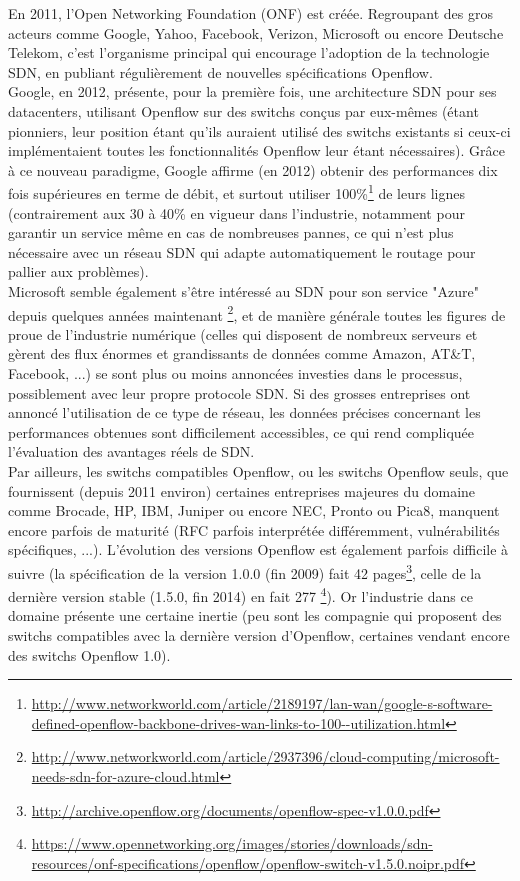 En 2011, l'Open Networking Foundation (ONF) est créée. Regroupant des gros acteurs comme Google, Yahoo, Facebook, Verizon, Microsoft ou encore Deutsche Telekom, c'est l'organisme principal qui encourage l'adoption de la technologie SDN, en publiant régulièrement de nouvelles spécifications Openflow.\\

Google, en 2012, présente, pour la première fois, une architecture SDN pour ses datacenters, utilisant Openflow sur des switchs conçus par eux-mêmes (étant pionniers, leur position étant qu'ils auraient utilisé des switchs existants si ceux-ci implémentaient toutes les fonctionnalités Openflow leur étant nécessaires). Grâce à ce nouveau paradigme, Google affirme (en 2012) obtenir des performances dix fois supérieures en terme de débit, et surtout utiliser 100\%\footnote{\url{http://www.networkworld.com/article/2189197/lan-wan/google-s-software-defined-openflow-backbone-drives-wan-links-to-100--utilization.html}} de leurs lignes (contrairement aux 30 à 40\% en vigueur dans l'industrie, notamment pour garantir un service même en cas de nombreuses pannes, ce qui n'est plus nécessaire avec un réseau SDN qui adapte automatiquement le routage pour pallier aux problèmes).\\

Microsoft semble également s'être intéressé au SDN pour son service "Azure" depuis quelques années maintenant \footnote{\url{http://www.networkworld.com/article/2937396/cloud-computing/microsoft-needs-sdn-for-azure-cloud.html}}, et de manière générale toutes les figures de proue de l'industrie  numérique (celles qui disposent de nombreux serveurs et gèrent des flux énormes et grandissants de données comme Amazon, AT\&T, Facebook, ...) se sont plus ou moins annoncées investies dans le processus, possiblement avec leur propre protocole SDN. Si des grosses entreprises ont annoncé l'utilisation de ce type de réseau, les données précises concernant les performances obtenues sont difficilement accessibles, ce qui rend compliquée l'évaluation des avantages réels de SDN.\\

Par ailleurs, les switchs compatibles Openflow, ou les switchs Openflow seuls, que fournissent (depuis 2011 environ) certaines entreprises majeures du domaine comme Brocade, HP, IBM, Juniper ou encore NEC, Pronto ou Pica8, manquent encore parfois de maturité (RFC parfois interprétée différemment, vulnérabilités spécifiques, ...). L'évolution des versions Openflow est également parfois difficile à suivre (la spécification de la version 1.0.0 (fin 2009) fait 42 pages\footnote{\label{OF_10}\url{http://archive.openflow.org/documents/openflow-spec-v1.0.0.pdf}}, celle de la dernière version stable (1.5.0, fin 2014) en fait 277 \footnote{\label{OF_15}\url{https://www.opennetworking.org/images/stories/downloads/sdn-resources/onf-specifications/openflow/openflow-switch-v1.5.0.noipr.pdf}}). Or l'industrie dans ce domaine présente une certaine inertie (peu sont les compagnie qui proposent des switchs compatibles avec la dernière version d'Openflow, certaines vendant encore des switchs Openflow 1.0).\\


